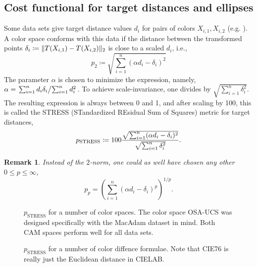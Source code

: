 \documentclass{scrartcl}
\newtheorem*{remark}{Remark}
\theoremstyle{named}
\DeclarePairedDelimiter{\norm}{\lVert}{\rVert}
\begin{document}
\subsection{Cost functional for target distances and ellipses}

Some data sets give target distance values $d_i$ for pairs of colors $X_{i,1}, X_{i,2}$
(e.g. \cite{macadam1974}). A color space conforms with this data if the distance
between the transformed points
$\delta_i \coloneqq \norm{T(X_{i,1}) - T(X_{i,2})}_2$
is close to a scaled $d_i$, i.e.,
\begin{equation}\label{eq:p}
  p_2
  \coloneqq \sqrt{\sum_{i=1}^n (\alpha d_i - \delta_i)^2}
\end{equation}
The parameter $\alpha$ is chosen to minimize the expression, namely, $\alpha =
\left.\sum_{i=1}^n d_i \delta_i \middle/ \sum_{i=1}^n d_i^2\right.$.
To achieve scale-invariance, one divides by
$\sqrt{\sum_{i=1}^n \delta_i^2}$.
The resulting expression is always between 0 and 1, and after scaling by 100, this is
called the STRESS (STandardized REsidual Sum of Squares) metric for target distances,
\begin{equation}\label{eq:p}
  p_{\text{STRESS}}
  \coloneqq
  100
  \frac{%
    \sqrt{\sum_{i=1}^n (\alpha d_i - \delta_i)^2}
  }{
    \sqrt{\sum_{i=1}^n \delta_i^2}
  }.
\end{equation}

\begin{remark}
Instead of the $2$-norm, one could as well have chosen any other $0\le p\le\infty$,
\[
p_p= \left(\sum_{i=1}^n (\alpha d_i - \delta_i)^p\right)^{1/p}.
\]

\end{remark}

\begin{figure}
\centering

\caption{$p_\text{STRESS}$ for a number of color spaces. The color space OSA-UCS was
designed specifically with the MacAdam \cite{macadam1974} dataset in mind. Both CAM
spaces perform well for all data sets.}
\end{figure}

\begin{figure}
\centering
  
  \caption{$p_\text{STRESS}$ for a number of color diffence formulae.
  Note that CIE76 is really just the Euclidean distance in CIELAB.}
\end{figure}
\end{document}
